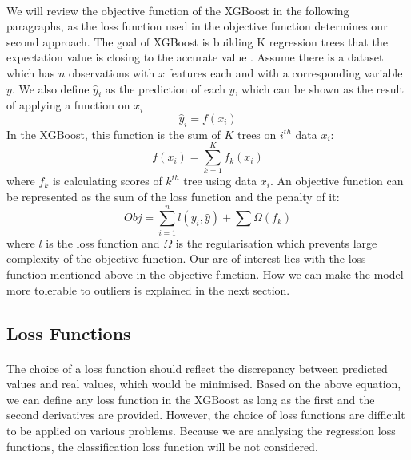 \documentclass[runningheads]{llncs}
\begin{document}
\paragraph{} We will review the objective function of the XGBoost in the following paragraphs, as the loss function used in the objective function determines our second approach. The goal of XGBoost is building K regression trees that the expectation value is closing to the accurate value \citep{chen2016xgboost}. Assume there is a dataset which has $n$ observations with $x$ features each and with a corresponding variable $y$. We also define $\hat{y}_i$ as the prediction of each $y$, which can be shown as the result of applying a function on $x_i$
\begin{equation}
    \hat{y}_i = f(x_i)
\end{equation}
In the XGBoost, this function is the sum of $K$ trees on $i^{th}$ data $x_i$:
\begin{equation}
    f(x_i) = \sum^K_{k=1} f_k(x_i)
\end{equation}
where $f_k$ is calculating scores of $k^{th}$ tree using data $x_i$. An objective function can be represented as the sum of the loss function and the penalty of it:
\begin{equation}
    Obj = \sum^n_{i=1}l(y_i, \hat{y}) + \sum \Omega(f_k)
\end{equation}
where $l$ is the loss function and $\Omega$ is the regularisation which prevents large complexity of the objective function. Our are of interest lies with the loss function mentioned above in the objective function. How we can make the model more tolerable to outliers is explained in the next section.

\subsection{Loss Functions}
\paragraph{}The choice of a loss function should reflect the discrepancy between predicted values and real values, which would be minimised. Based on the above equation, we can define any loss function in the XGBoost as long as the first and the second derivatives are provided. However, the choice of loss functions are difficult to be applied on various problems. Because we are analysing the regression loss functions, the classification loss function will be not considered.
\end{document}

